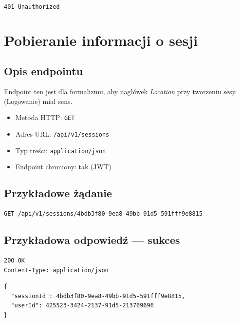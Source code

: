 \documentclass[11pt, a4paper]{article}
\begin{document}
\begin{lstlisting}[style=http,caption={Odpowiedź HTTP — błędna autoryzacja}]
401 Unauthorized
\end{lstlisting}
\section{Pobieranie informacji o sesji}

\subsection{Opis endpointu}
Endpoint ten jest dla formalizmu, aby nagłówek \textit{Location}
przy tworzeniu sesji (Logowanie) miał sens.

\begin{itemize}
    \item Metoda HTTP: \texttt{GET}
    \item Adres URL: \texttt{/api/v1/sessions}
    \item Typ treści: \texttt{application/json}
    \item Endpoint chroniony: tak (JWT)
\end{itemize}

\subsection{Przykładowe żądanie}

\begin{lstlisting}[style=http,caption={Przykładowe żądanie logowania}]
GET /api/v1/sessions/4bdb3f80-9ea8-49bb-91d5-591fff9e8815
\end{lstlisting}

\subsection{Przykładowa odpowiedź — sukces}

\begin{lstlisting}[style=http,caption={Odpowiedź HTTP — sukces}]
20O OK
Content-Type: application/json

\end{lstlisting}

\begin{lstlisting}[style=json,caption={Ciało odpowiedzi — sukces}]
{
  "sessionId": 4bdb3f80-9ea8-49bb-91d5-591fff9e8815,
  "userId": 425523-3424-2137-91d5-213769696
}
\end{lstlisting}
\end{document}
